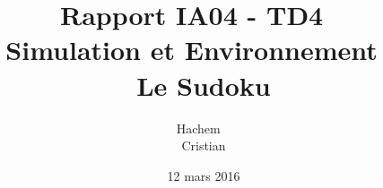 \documentclass[11pt]{report}
\title{Rapport IA04 - TD4 ~\\ Simulation et Environnement ~\\ Le Sudoku}
\author{Hachem \bsc{Benyahia} ~\\ Cristian \bsc{Ghitu}}
\date{12 mars 2016}
\begin{document}
\maketitle

\renewcommand{\contentsname}{\centering Sommaire \vspace*{2 cm}}
\tableofcontents

\newpage
\selectfont
\end{document}
